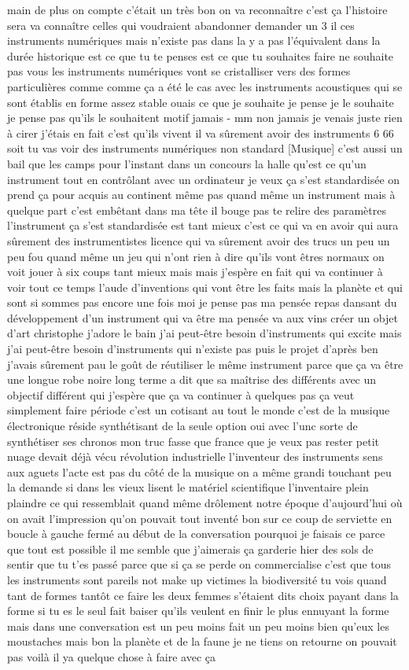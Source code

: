 main de plus on compte c'était un très bon on va reconnaître c'est ça l'histoire sera va connaître celles qui voudraient abandonner demander un 3 il ces instruments numériques mais n'existe pas dans la y a pas l'équivalent dans la durée historique est ce que tu te penses est ce que tu souhaites faire ne souhaite pas vous les instruments numériques vont se cristalliser vers des formes particulières comme comme ça a été le cas avec les instruments acoustiques qui se sont établis en forme assez stable ouais ce que je souhaite je pense je le souhaite je pense pas qu'ils le souhaitent motif jamais - mm non jamais je venais juste rien à cirer j'étais en fait c'est qu'ils vivent il va sûrement avoir des instruments 6 66 soit tu vas voir des instruments numériques non standard [Musique] c'est aussi un bail que les camps pour l'instant dans un concours la halle qu'est ce qu'un instrument tout en contrôlant avec un ordinateur je veux ça s'est standardisée on prend ça pour acquis au continent même pas quand même un instrument mais à quelque part c'est embêtant dans ma tête il bouge pas te relire des paramètres l'instrument ça s'est standardisée est tant mieux c'est ce qui va en avoir qui aura sûrement des instrumentistes licence qui va sûrement avoir des trucs un peu un peu fou quand même un jeu qui n'ont rien à dire qu'ils vont êtres normaux on voit jouer à six coups tant mieux mais mais j'espère en fait qui va continuer à voir tout ce temps l'aude d'inventions qui vont être les faits mais la planète et qui sont si sommes pas encore une fois moi je pense pas ma pensée repas dansant du développement d'un instrument qui va être ma pensée va aux vins créer un objet d'art christophe j'adore le bain j'ai peut-être besoin d'instruments qui excite mais j'ai peut-être besoin d'instruments qui n'existe pas puis le projet d'après ben j'avais sûrement pau le goût de réutiliser le même instrument parce que ça va être une longue robe noire long terme a dit que sa maîtrise des différents avec un objectif différent qui j'espère que ça va continuer à quelques pas ça veut simplement faire période c'est un cotisant au tout le monde c'est de la musique électronique réside synthétisant de la seule option oui avec l'unc sorte de synthétiser ses chronos mon truc fasse que france que je veux pas rester petit nuage devait déjà vécu révolution industrielle l'inventeur des instruments sens aux aguets l'acte est pas du côté de la musique on a même grandi touchant peu la demande si dans les vieux lisent le matériel scientifique l'inventaire plein plaindre ce qui ressemblait quand même drôlement notre époque d'aujourd'hui où on avait l'impression qu'on pouvait tout inventé bon sur ce coup de serviette en boucle à gauche fermé au début de la conversation pourquoi je faisais ce parce que tout est possible il me semble que j'aimerais ça garderie hier des sols de sentir que tu t'es passé parce que si ça se perde on commercialise c'est que tous les instruments sont pareils not make up victimes la biodiversité tu vois quand tant de formes tantôt ce faire les deux femmes s'étaient dits choix payant dans la forme si tu es le seul fait baiser qu'ils veulent en finir le plus ennuyant la forme mais dans une conversation est un peu moins fait un peu moins bien qu'eux les moustaches mais bon la planète et de la faune je ne tiens on retourne on pouvait pas voilà il ya quelque chose à faire avec ça

